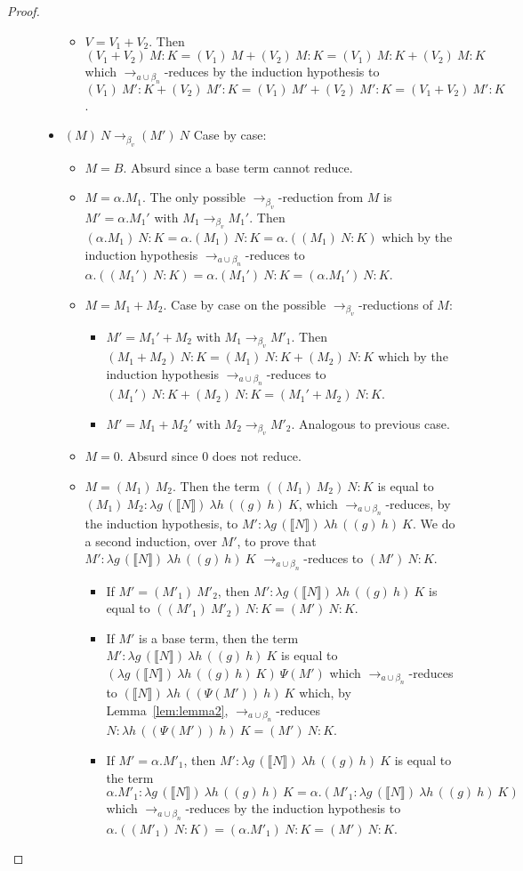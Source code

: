 \documentclass{LMCS}
\newcommand{\xto}[1]{\ensuremath{\rightarrow_{#1}}}
\newcommand{\tobv}{\xto{\beta_v}}
\newcommand{\tobalgred}{\xto{a\cup\beta_n}}
\newcommand{\wt}[1]{\llbracket{#1}\rrbracket}
\begin{document}
\begin{proof}
\begin{description}
\begin{itemize}
\begin{itemize}
	    \item $V=V_1+V_2$. Then $(V_1+V_2)~M  : K = (V_1)~M  + (V_2)~M: K= (V_1)~M : K + (V_2)~M: K$  which $\tobalgred $-reduces by the induction hypothesis to $(V_1)~M' : K + (V_2)~M': K= (V_1)~M'+(V_2)~M':K=(V_1+V_2)~M' : K$.
	  \end{itemize}
	\item $(M)~N\tobv (M')~N$ Case by case:
	  \begin{itemize}
	    \item $M=B$. Absurd since a base term cannot reduce.
	    \item $M=\alpha.M_1$. The only possible $\tobv$-reduction from $M$ is $M'=\alpha.M_1'$ with $M_1\tobv M_1'$. Then $(\alpha.M_1)~N:K=\alpha.(M_1)~N:K=\alpha.((M_1)~N:K)$ which by the induction hypothesis $\tobalgred$-reduces to $\alpha.((M_1')~N:K)=\alpha.(M_1')~N:K=(\alpha.M_1')~N:K$.
	    \item $M=M_1+M_2$. Case by case on the possible $\tobv$-reductions of $M$:
	      \begin{itemize}
		\item $M'=M_1'+M_2$ with $M_1\tobv M'_1$. Then $(M_1+M_2)~N:K=(M_1)~N:K+(M_2)~N:K$ which by the induction hypothesis $\tobalgred$-reduces to $(M_1')~N:K+(M_2)~N:K=(M_1'+M_2)~N:K$.
		\item $M'=M_1+M_2'$ with $M_2\tobv M'_2$. Analogous to previous case.
	      \end{itemize}
	    \item $M=0$. Absurd since $0$ does not reduce.
	    \item $M=(M_1)~M_2$. Then the term $((M_1)~M_2)~N:K$ is equal to $(M_1)~M_2:\lambda g\,(\wt N)~\lambda h\,((g)~h)~K$, which $\tobalgred$-reduces, by the induction hypothesis, to $M':\lambda g\,(\wt N)~\lambda h\,((g)~h)~K$.
	      We do a second induction, over $M'$, to prove that $M':\lambda g\,(\wt{N})~\lambda h\,((g)~h)~K$ $\tobalgred$-reduces to $(M')~N:K$.
	      \begin{itemize} 
		\item If $M'=(M'_1)~M'_2$, then $M':\lambda g\,(\wt{N})~\lambda h\,((g)~h)~K$ is equal to $((M'_1)~M'_2)~N:K=(M')~N:K$.
		\item If $M'$ is a base term, then the term $M':\lambda g\,(\wt{N})~\lambda h\,((g)~h)~K$ is equal to $(\lambda g\,(\wt{N})~\lambda h\,((g)~h)~K)~\Psi(M')$ which $\tobalgred$-reduces to $(\wt{N})~\lambda h\,((\Psi(M'))~h)~K$  which, by Lemma~\ref{lem:lemma2}, $\tobalgred$-reduces $ N : \lambda h\,((\Psi(M'))~h)~K = (M')~N:K$.
		\item If $M' = \alpha.M'_1$, then $M':\lambda g\,(\wt{N})~\lambda h\,((g)~h)~K$ is equal to the term $\alpha.M'_1:\lambda g\,(\wt{N})~\lambda h\,((g)~h)~K=\alpha.(M'_1:\lambda g\,(\wt{N})~\lambda h\,((g)~h)~K)$ which $\tobalgred$-reduces by the induction hypothesis to $\alpha.((M'_1)~N:K) = (\alpha.M'_1)~N:K = (M')~N : K$.

\end{itemize}
\end{itemize}
\end{itemize}
\end{description}
\end{proof}
\end{document}

